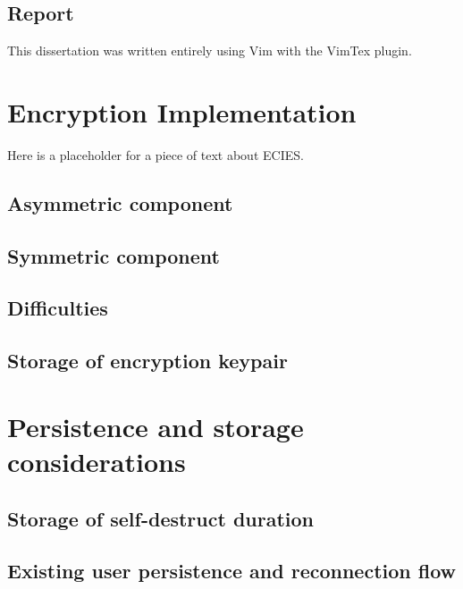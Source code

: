 \documentclass{mproj}
\begin{document}
\subsection{Report}
This dissertation was written entirely using Vim with the VimTex plugin.
\section{Encryption Implementation}\label{encryption}
\cite{martinez2010comparison}Here is a placeholder for a piece of text about ECIES.
\subsection{Asymmetric component}\label{asymmetric}

\subsection{Symmetric component}\label{symmetric}

\subsection{Difficulties}\label{encryptionDifficulties}

\subsection{Storage of encryption keypair}

\section{Persistence and storage considerations}
\subsection{Storage of self-destruct duration}
\subsection{Existing user persistence and reconnection flow}

\section{}

\section{}
\end{document}
